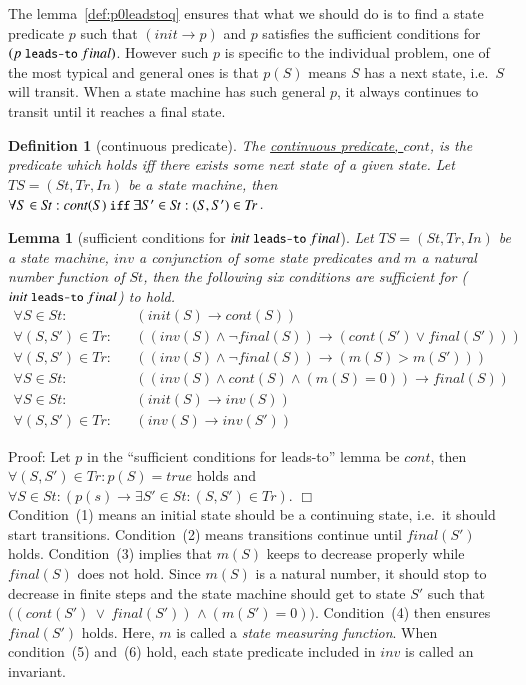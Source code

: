 \documentclass[12pt]{report}
\newtheorem{lemma}{Lemma}
\newtheorem{definition}{Definition}
\newcommand{\ra}{\rightarrow}
\newcommand{\mbstt}[1]{\mbox{\small{\tt {#1}}}}
\newcommand{\ul}{\underline}
\begin{document}
The lemma~\ref{def:p0leadstoq} ensures that what we should do is to find a state
predicate $p$ such that $(init\ra p)$ and $p$ satisfies the sufficient
conditions for $(p~\mbstt{leads-to}~final)$. However such $p$ is
specific to the individual problem, one of the most typical and
general ones is that $p(S)$ means $S$ has a next state, i.e.\ $S$ will
transit.  When a state machine has such general $p$, it always
continues to transit until it reaches a final state.

\begin{definition}[continuous predicate]
  The \ul{continuous predicate, $cont$}, is the predicate which holds
  iff there exists some next state of a given state.  Let
  $TS=(\mathit{St},\mathit{Tr},In)$ be a state machine, then $\forall S\in \mathit{St}:cont(S)
  ~\mbstt{iff}~ \exists S'\in \mathit{St}:(S,S')\in \mathit{Tr}$.
\end{definition}

\begin{lemma}[sufficient conditions for $init~\mbstt{leads-to}~final$]
  Let $TS=(\mathit{St},\mathit{Tr},In)$ be a state machine, $inv$ a conjunction of
  some state predicates and $m$ a natural number function of $\mathit{St}$,
  then the following six conditions are sufficient for
  ($init~\mbstt{leads-to}~final$) to hold.
  \begin{eqnarray}
  \forall S\in \mathit{St}:&&(init(S)\ra cont(S))\\
  \forall (S,S')\in \mathit{Tr}:&&((inv(S)\land\neg final(S))
  \ra(cont(S')\lor final(S')))\\
  \forall (S,S')\in \mathit{Tr}:&&((inv(S)\land\neg final(S))\ra(m(S)> m(S')))\\
  \forall S\in \mathit{St}:&&((inv(S)\land cont(S)\land(m(S) = 0))\ra final(S))\\
  \forall S\in \mathit{St}:&&(init(S)\ra inv(S))\\
  \forall (S,S')\in \mathit{Tr}:&&(inv(S)\ra inv(S'))
  \end{eqnarray}
\end{lemma}
Proof: Let $p$ in the ``sufficient conditions for leads-to'' lemma
be $cont$, then $\forall (S,S')\in \mathit{Tr}:p(S)=true$ holds and
$\forall S\in \mathit{St}:(p(s)\ra\exists S'\in \mathit{St}:(S,S')\in \mathit{Tr})$. $\Box$\\

Condition~(1) means an initial state should be a
continuing state, i.e.\ it should start
transitions. Condition~(2) means transitions continue
until $final(S')$ holds. Condition~(3) implies that
$m(S)$ keeps to decrease properly while $final(S)$ does not
hold. Since $m(S)$ is a natural number, it should stop to decrease in
finite steps and the state machine should get to state $S'$ such that
$((cont(S')\ \lor\ final(S'))$ $\land\ (m(S') = 0))$.
Condition~(4) then ensures $final(S')$ holds. Here, $m$ is
called a {\it state measuring function}. When
condition~(5) and~(6) hold, each state
predicate included in $inv$ is called an invariant.
\end{document}
